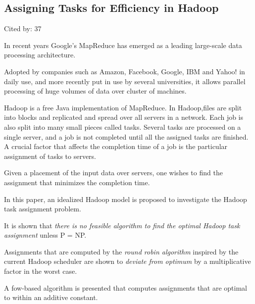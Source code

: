 \documentclass[a4paper,11pt]{article}
\begin{document}
\subsection*{Assigning Tasks for Efficiency in Hadoop}
{\color{cyan} {\color{magenta} Cited by: 37}

In recent years Google's MapReduce has emerged as a leading large-scale data processing architecture. 

Adopted by companies such as Amazon, Facebook, Google, IBM and Yahoo! in daily use, and 
more recently put in use by several universities, 
it allows parallel processing of huge volumes of data over cluster of machines. 

Hadoop is a free Java implementation of MapReduce. 
In Hadoop,files are split into blocks and replicated and spread over all servers in a network.
Each job is also split into many small pieces called tasks. 
Several tasks are processed on a single server, and a job is not completed until all the assigned tasks are finished.
A crucial factor that affects the completion time of a job is the particular assignment of tasks to servers. 

Given a placement of the input data over servers, 
one wishes to find the assignment that minimizes the completion time. 

In this paper, 
{\color{black} an idealized Hadoop model \cite{hadoopmodel}}
is proposed 
to investigate the Hadoop task assignment problem. 

It is shown that 
{\em there is no feasible algorithm to find the optimal Hadoop task assignment} 
unless P = NP. 

Assignments that are computed by the 
{\em round robin algorithm} 
inspired by the current Hadoop scheduler are shown to 
{\em deviate from optimum} 
by a multiplicative factor in the worst case. 

A fow-based algorithm is presented that 
computes assignments that are optimal to within an additive constant.	

}
\end{document}

